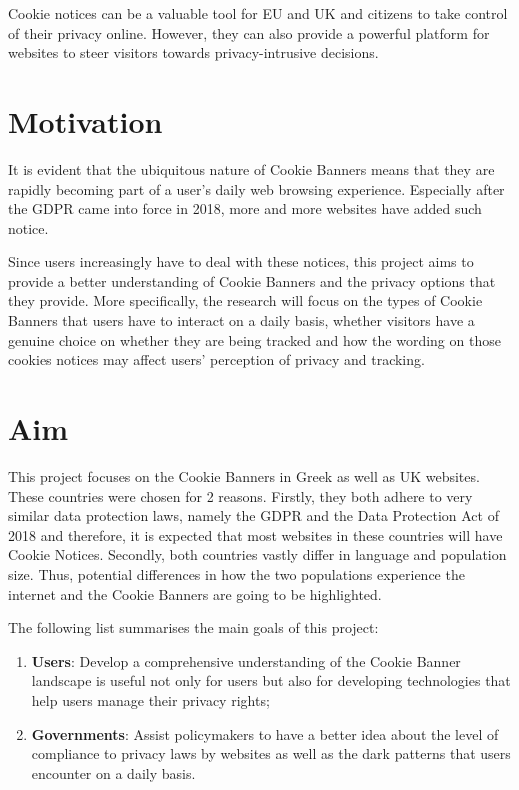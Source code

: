 \documentclass[../main.tex]{subfiles}
\begin{document}
Cookie notices can be a valuable tool for EU and UK and citizens to take control of their privacy online. However, they can also provide a powerful platform for websites to steer visitors towards privacy-intrusive decisions. 

\section{Motivation}
It is evident that the ubiquitous nature of Cookie Banners means that they are rapidly becoming part of a user’s daily web browsing experience. Especially after the GDPR came into force in 2018, more and more websites have added such notice. 

Since users increasingly have to deal with these notices, this project aims to provide a better understanding of Cookie Banners and the privacy options that they provide. More specifically, the research will focus on the types of Cookie Banners that users have to interact on a daily basis, whether visitors have a genuine choice on whether they are being tracked and how the wording on those cookies notices may affect users’ perception of privacy and tracking.

\section{Aim}
This project focuses on the Cookie Banners in Greek as well as UK websites. These countries were chosen for 2 reasons. Firstly, they both adhere to very similar data protection laws, namely the GDPR and the Data Protection Act of 2018 and therefore, it is expected that most websites in these countries will have Cookie Notices. Secondly, both countries vastly differ in language and population size. Thus, potential differences in how the two populations experience the internet and the Cookie Banners are going to be highlighted.

The following list summarises the main goals of this project:

\begin{enumerate}
    \item \textbf{Users}: Develop a comprehensive understanding of the Cookie Banner landscape is useful not only for users but also for developing technologies that help users manage their privacy rights;
    \item \textbf{Governments}: Assist policymakers to have a better idea about the level of compliance to privacy laws by websites as well as the dark patterns that users encounter on a daily basis.
\end{enumerate}
\end{document}
